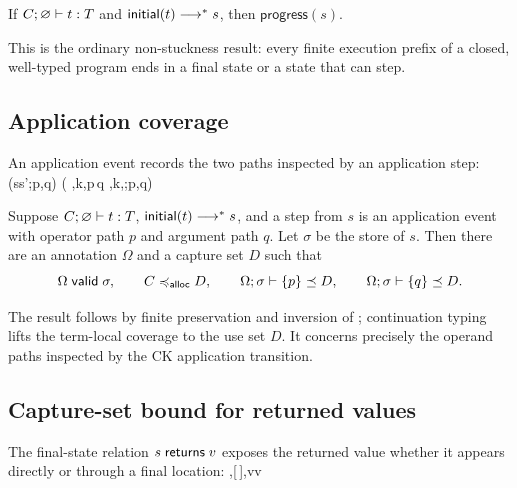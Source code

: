 \documentclass[acmsmall,screen,nonacm]{acmart}
\begin{document}
\begin{theorem}
\label{thm:type-safety}
If \({C}; {\varnothing}\vdash {t} : {T}\) and
\(\mathsf{initial}(t)\longrightarrow^{*} s\), then \(\mathsf{progress}(s)\).
\end{theorem}

This is the ordinary non-stuckness result: every finite execution prefix of a
closed, well-typed program ends in a final state or a state that can step.

\subsection{Application coverage}

An application event records the two paths inspected by an application step:
\begingroup
{}
{}
 {(s\sstep s';p,q)}
  {(
    \langle\sigma,k,p\,q\rangle\sstep
    \langle\sigma,k,\rangle;p,q)}
\endgroup

\begin{theorem}
\label{thm:application-coverage}
Suppose \({C}; {\varnothing}\vdash {t} : {T}\),
\(\mathsf{initial}(t)\longrightarrow^{*} s\), and a step from \(s\) is an application
event with operator path \(p\) and argument path \(q\). Let \(\sigma\) be the
store of \(s\). Then there are an annotation \(\Omega\) and a capture set
\(D\) such that
\[
 \Omega\mathrel{\mathsf{valid}}\sigma,
 \qquad
 C\mathrel{\preccurlyeq_{\mathsf{alloc}}} D,
 \qquad
 \Omega;\sigma\vdash\{{p}\}\mathrel{\preceq} D,
 \qquad
 \Omega;\sigma\vdash\{{q}\}\mathrel{\preceq} D.
\]
\end{theorem}

The result follows by finite preservation and inversion of
; continuation typing lifts the term-local coverage to the
use set \(D\). It concerns precisely the operand paths inspected by
the CK application transition.

\subsection{Capture-set bound for returned values}

The final-state relation \(s\mathrel{\mathsf{returns}} v\) exposes the returned value whether
it appears directly or through a final location:
\begingroup
{}
{}
  {\langle\sigma,[\,],v\rangle\returns v}
\end{document}
